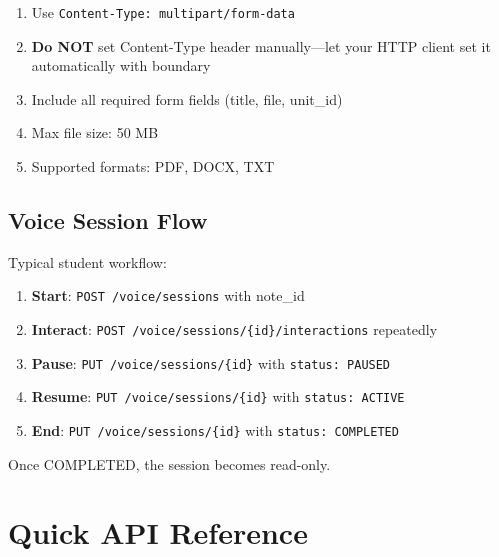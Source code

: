 \documentclass[12pt,a4paper,oneside]{article}
\begin{document}
\begin{enumerate}
    \item Use \texttt{Content-Type: multipart/form-data}
    \item \textbf{Do NOT} set Content-Type header manually—let your HTTP client set it automatically with boundary
    \item Include all required form fields (title, file, unit\_id)
    \item Max file size: 50 MB
    \item Supported formats: PDF, DOCX, TXT
\end{enumerate}

\subsection{Voice Session Flow}

Typical student workflow:

\begin{enumerate}
    \item \textbf{Start}: \texttt{POST /voice/sessions} with note\_id
    \item \textbf{Interact}: \texttt{POST /voice/sessions/\{id\}/interactions} repeatedly
    \item \textbf{Pause}: \texttt{PUT /voice/sessions/\{id\}} with \texttt{status: PAUSED}
    \item \textbf{Resume}: \texttt{PUT /voice/sessions/\{id\}} with \texttt{status: ACTIVE}
    \item \textbf{End}: \texttt{PUT /voice/sessions/\{id\}} with \texttt{status: COMPLETED}
\end{enumerate}

Once COMPLETED, the session becomes read-only.

\newpage

\section{Quick API Reference}
\end{document}
